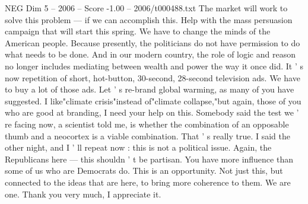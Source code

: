 \begin{textsample}{NEG Dim 5 – 2006 – Score -1.00 – 2006/t000488.txt}
The market will work to solve this problem — if we can accomplish this.
Help with the mass persuasion campaign that will start this spring.
We have to change the minds of the American people.
Because presently, the politicians do not have permission to do what needs to be done.
And in our modern country, the role of logic and reason no longer includes mediating between wealth and power the way it once did.
It ' s now repetition of short, hot-button, 30-second, 28-second television ads.
We have to buy a lot of those ads.
Let ' s re-brand global warming, as many of you have suggested.
I like"climate crisis"instead of"climate collapse,"but again, those of you who are good at branding, I need your help on this.
Somebody said the test we ' re facing now, a scientist told me, is whether the combination of an opposable thumb and a neocortex is a viable combination.
That ' s really true.
I said the other night, and I ' ll repeat now : this is not a political issue.
Again, the Republicans here — this shouldn ' t be partisan.
You have more influence than some of us who are Democrats do.
This is an opportunity.
Not just this, but connected to the ideas that are here, to bring more coherence to them.
We are one.
Thank you very much, I appreciate it.

\end{textsample}
